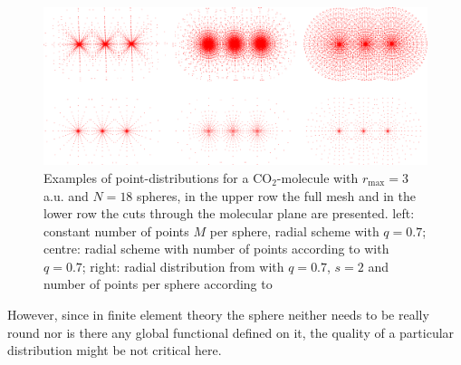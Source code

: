 \begin{figure}
   \includegraphics[width=\textwidth]{Figures/CO2_grid}
   \caption{Examples of point-distributions for a CO$_2$-molecule with $r_\text{max}=3\,$a.u. and $N=18$ spheres, in the upper row the full mesh and in the lower row the cuts through the molecular plane are presented.
   left: constant number of points $M$ per sphere, radial scheme  with $q=0.7$; centre: radial scheme  with number of points according to  with $q=0.7$; right: radial distribution from  with $q=0.7$, $s=2$ and number of points per sphere according to }
   \label{fig:molmesh}
\end{figure}
However, since in finite element theory the sphere neither needs to be really round nor is there any global functional defined on it, the quality of a particular distribution might be not critical here.


